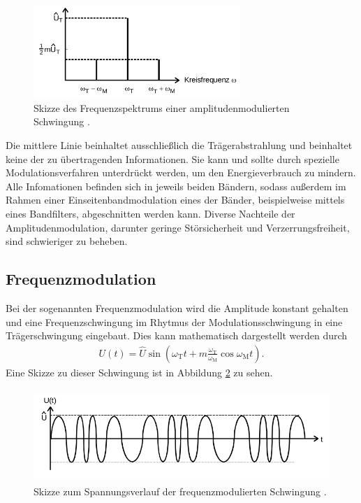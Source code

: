\begin{figure}
  \centering
  \includegraphics[height=3.5cm]{JasperErsterSchultag/freqspektrum.png}
  \caption{Skizze des Frequenzspektrums einer amplitudenmodulierten Schwingung \cite{anleitung}.}
  \label{fig:freqspektrum}
\end{figure}

Die mittlere Linie beinhaltet ausschließlich die Trägerabstrahlung und beinhaltet keine der zu übertragenden
Informationen. Sie kann und sollte durch spezielle Modulationsverfahren unterdrückt werden, um den Energieverbrauch
zu mindern. Alle Infomationen befinden sich in jeweils beiden Bändern, sodass außerdem im Rahmen einer
Einseitenbandmodulation eines der Bänder, beispielweise mittels eines Bandfilters, abgeschnitten werden kann.
Diverse Nachteile der Amplitudenmodulation, darunter geringe Störsicherheit und Verzerrungsfreiheit, sind
schwieriger zu beheben.

\subsection{Frequenzmodulation}

Bei der sogenannten Frequenzmodulation wird die Amplitude konstant gehalten und eine Frequenzschwingung im Rhytmus
der Modulationsschwingung in eine Trägerschwingung eingebaut. Dies kann mathematisch dargestellt werden durch
\begin{align}
  U(t) = \hat{U} \sin \left( \omega_\text{T} t + m \frac{\omega_\text{T}}{\omega_\text{M}} \cos{ \omega_\text{M} t } \right).
\end{align}
Eine Skizze zu dieser Schwingung ist in Abbildung \ref{fig:freqmodskizze} zu sehen.

\begin{figure}
  \centering
  \includegraphics[height=3.5cm]{JasperErsterSchultag/freqmodskizze.png}
  \caption{Skizze zum Spannungsverlauf der frequenzmodulierten Schwingung \cite{anleitung}.}
  \label{fig:freqmodskizze}
\end{figure}

